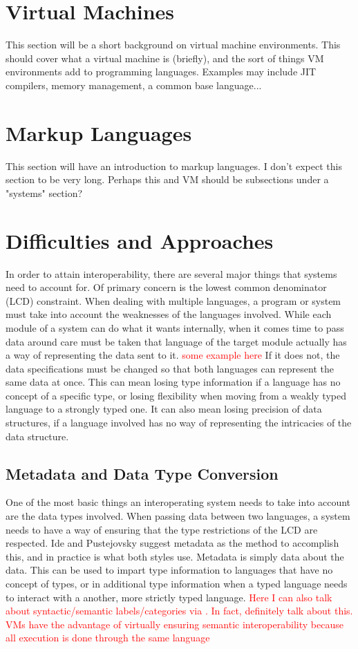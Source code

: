 \documentclass{sig-alternate}
\newcommand{\mycomment}[1]{\textcolor{red}{#1}}
\begin{document}
\section{Virtual Machines}\label{VM}
This section will be a short background on virtual machine environments. This should cover what a virtual machine is (briefly), and the sort of things VM environments add to programming languages. Examples may include JIT compilers, memory management, a common base language...


\section{Markup Languages}\label{ML}
This section will have an introduction to markup languages. I don't expect this section to be very long. Perhaps this and VM should be subsections under a "systems" section?

\section{Difficulties and Approaches}\label{approaches}
In order to attain interoperability, there are several major things that systems need to account for. Of primary concern is the lowest common denominator (LCD) constraint.
When dealing with multiple languages, a program or system must take into account the weaknesses of the languages involved. While each module of a system can do what it wants internally, when it comes time to pass data around care must be taken that language of the target module actually has a way of representing the data sent to it. \mycomment{some example here}
If it does not, the data specifications must be changed so that both languages can represent the same data at once. This can mean losing type information if a language has no concept of a specific type, or losing flexibility when moving from a weakly typed language to a strongly typed one. It can also mean losing precision of data structures, if a language involved has no way of representing the intricacies of the data structure.

\subsection{Metadata and Data Type Conversion}\label{metadata} \mycomment{\cite{Ide:2010, Bromberg:2011, Hamilton:2003}}
One of the most basic things an interoperating system needs to take into account are the data types involved. 
When passing data between two languages, a system needs to have a way of ensuring that the type restrictions of the LCD are respected. Ide and Pustejovsky \cite{Ide:2010} suggest metadata as the method to accomplish this, and in practice is what both styles use. Metadata is simply data about the data. This can be used to impart type information to languages that have no concept of types, or in additional type information when a typed language needs to interact with a another, more strictly typed language.
\mycomment{Here I can also talk about syntactic/semantic labels/categories via \cite{Ide:2010}. In fact, definitely talk about this. VMs have the advantage of virtually ensuring semantic interoperability because all execution is done through the same language}
\end{document}
